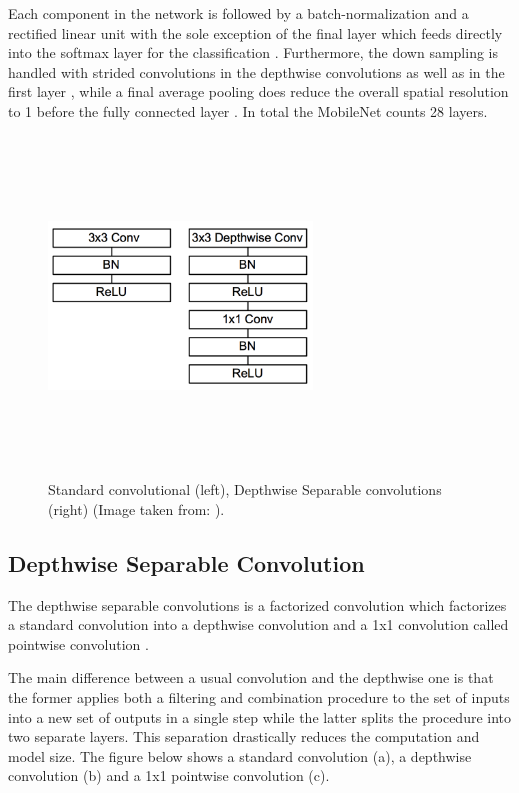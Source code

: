 Each component in the network is followed by a batch-normalization and a rectified linear unit with the sole exception of the final layer which feeds directly into the softmax layer for the classification \cite{paper:MobileNets}. Furthermore, the down sampling is handled with strided convolutions in the depthwise convolutions as well as in the first layer \cite{paper:MobileNets}, while a final average pooling does reduce the overall spatial resolution to 1 before the fully connected layer \cite{paper:MobileNets}. In total the MobileNet counts 28 layers.

\begin{figure}[!htbp]
\begin{center}
\includegraphics[width=7cm,height=9cm,keepaspectratio]{images/mobileNet_contrast.png}
\end{center}
\caption{Standard convolutional (left), Depthwise Separable convolutions (right) (Image taken from: \cite{paper:MobileNets}).}
\end{figure}

\subsection{Depthwise Separable Convolution}

The depthwise separable convolutions is a factorized convolution which factorizes a standard convolution into a depthwise convolution and a 1x1 convolution called pointwise convolution \cite{paper:MobileNets}.

The main difference between a usual convolution and the depthwise one is that the former applies both a filtering and combination procedure to the set of inputs into a new set of outputs in a single step \cite{paper:MobileNets} while the latter splits the procedure into two separate layers. This separation drastically reduces the computation and model size. The figure below shows a standard convolution (a), a depthwise convolution (b) and a 1x1 pointwise convolution (c).


